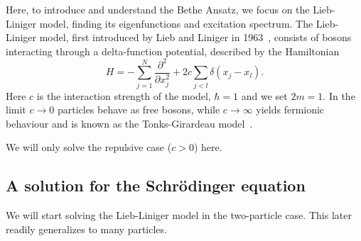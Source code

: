 \documentclass[11pt, a4paper]{report} %
\begin{document}
Here, to introduce and understand the Bethe Ansatz, we focus on the Lieb-Liniger model, finding its eigenfunctions and excitation spectrum.
The Lieb-Liniger model, first introduced by Lieb and Liniger in 1963~\cite{Lieb1963, Lieb1963a}, consists of bosons interacting through a delta-function potential, described by the Hamiltonian
\begin{equation}
	H = - \sum_{j=1}^{N} \frac{\partial^2}{\partial x_j^2} + 2c \sum_{j<l} \delta(x_j - x_l).
\end{equation}
Here \(c\) is the interaction strength of the model, \(\hbar=1\) and we set \(2m=1\).
In the limit \(c\to0\) particles behave as free bosons, while \(c\to\infty\) yields fermionic behaviour and is known as the Tonks-Girardeau model~\cite{Lieb1963, Franchini2017}.

We will only solve the repulsive case (\(c > 0\)) here.

\subsection{A solution for the Schrödinger equation}

We will start solving the Lieb-Liniger model in the two-particle case. This later readily generalizes to many particles.
\end{document}
